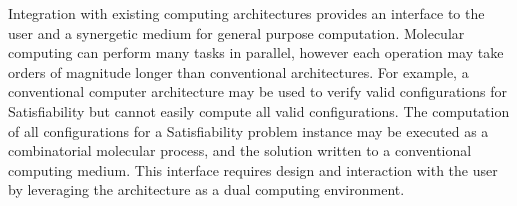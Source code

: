Integration with existing computing architectures provides an interface to the user and a synergetic medium for general purpose computation.  Molecular computing can perform many tasks in parallel, however each operation may take orders of magnitude longer than conventional architectures.  For example, a conventional computer architecture may be used to verify valid configurations for {\sc Satisfiability} but cannot easily compute all valid configurations.  The computation of all configurations for a {\sc Satisfiability} problem instance may be executed as a combinatorial molecular process, and the solution written to a conventional computing medium.  This interface requires design and interaction with the user by leveraging the architecture as a dual computing environment.   
